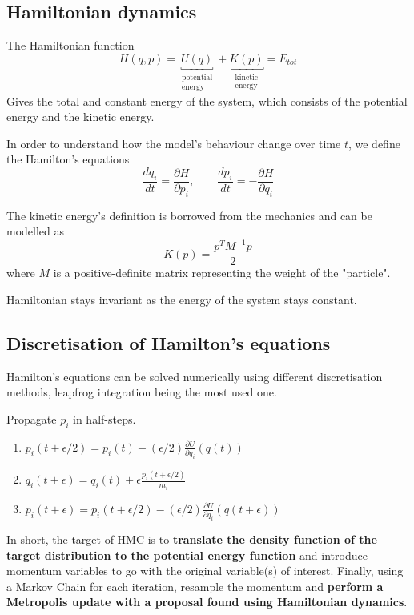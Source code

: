 \documentclass[letterpaper, 12pt]{article}
\newcommand{\myexample}[2]{
    \begin{tcolorbox}[colback=black!5!white,colframe=black,title={Example: #1},
    before skip=12pt]
        #2
    \end{tcolorbox}
}
\newcommand{\1}{\mathds{1}} %
\theoremstyle{definition}
\begin{document}
\subsection{Hamiltonian dynamics}
The Hamiltonian function
\[
  H(q, p) = \underbracket{U(q)}_{\substack{\text{potential} \\ \text{energy}}} + \underbracket{K(p)}_{\substack{\text{kinetic} \\ \text{energy}}} = E_{tot}
\]
Gives the total and constant energy of the system, which consists of the potential energy and the kinetic energy.

In order to understand how the model's behaviour change over time $t$, we define the Hamilton's equations
\[
  \frac{d q_i}{dt} = \frac{\partial H}{\partial p_i}, \qquad
  \frac{d p_i}{dt} = -\frac{\partial H}{\partial q_i}
\]


The kinetic energy's definition is borrowed from the mechanics and can be modelled as
\[
  K(p) = \frac{p^T M^{-1} p}{2}
\]
where $M$ is a positive-definite matrix representing the weight of the "particle".

Hamiltonian stays invariant as the energy of the system stays constant.

\subsection{Discretisation of Hamilton's equations}

Hamilton's equations can be solved numerically using different discretisation methods, leapfrog integration being the most used one.

\myexample{The leapfrog method}{
Propagate $p_i$ in half-steps.
\begin{enumerate}
  \item $p_i(t + \epsilon/2) = p_i(t) - (\epsilon/2)\frac{\partial U}{\partial q_i}(q(t))$
  \item $q_i(t+\epsilon) = q_i(t) + \epsilon \frac{p_i(t+\epsilon/2)}{m_i}$
  \item $p_i(t + \epsilon) = p_i(t + \epsilon/2) - (\epsilon/2)\frac{\partial U}{\partial q_i}(q(t + \epsilon))$
\end{enumerate}
}

In short, the target of HMC is to \textbf {translate the density function of the target distribution to the potential energy function} and introduce momentum variables to go with the original variable(s) of interest. Finally, using a Markov Chain for each iteration, resample the momentum and \textbf {perform a Metropolis update with a proposal found using Hamiltonian dynamics}.
\end{document}
